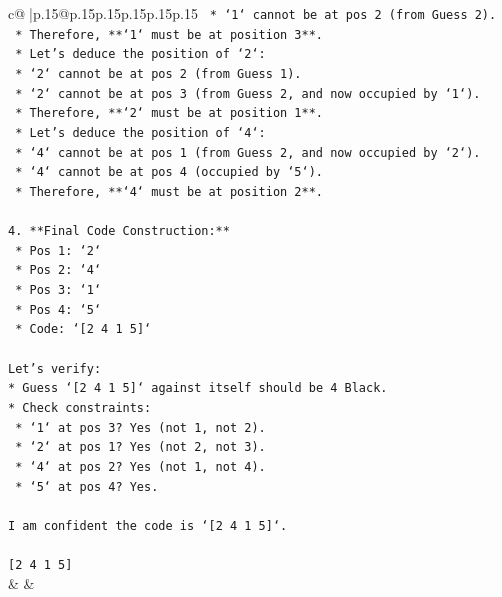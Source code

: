 \documentclass{article}
\begin{document}
{\begin{supertabular}{c@{$\;$}|p{.15\linewidth}@{}p{.15\linewidth}p{.15\linewidth}p{.15\linewidth}p{.15\linewidth}p{.15\linewidth}}
{{{\texttt{        *   `1` cannot be at pos 2 (from Guess 2).} \\
\texttt{        *   Therefore, **`1` must be at position 3**.} \\
\texttt{    *   Let's deduce the position of `2`:} \\
\texttt{        *   `2` cannot be at pos 2 (from Guess 1).} \\
\texttt{        *   `2` cannot be at pos 3 (from Guess 2, and now occupied by `1`).} \\
\texttt{        *   Therefore, **`2` must be at position 1**.} \\
\texttt{    *   Let's deduce the position of `4`:} \\
\texttt{        *   `4` cannot be at pos 1 (from Guess 2, and now occupied by `2`).} \\
\texttt{        *   `4` cannot be at pos 4 (occupied by `5`).} \\
\texttt{        *   Therefore, **`4` must be at position 2**.} \\
\\ 
\texttt{4.  **Final Code Construction:**} \\
\texttt{    *   Pos 1: `2`} \\
\texttt{    *   Pos 2: `4`} \\
\texttt{    *   Pos 3: `1`} \\
\texttt{    *   Pos 4: `5`} \\
\texttt{    *   Code: `{[}2 4 1 5{]}`} \\
\\ 
\texttt{Let's verify:} \\
\texttt{*   Guess `{[}2 4 1 5{]}` against itself should be 4 Black.} \\
\texttt{*   Check constraints:} \\
\texttt{    *   `1` at pos 3? Yes (not 1, not 2).} \\
\texttt{    *   `2` at pos 1? Yes (not 2, not 3).} \\
\texttt{    *   `4` at pos 2? Yes (not 1, not 4).} \\
\texttt{    *   `5` at pos 4? Yes.} \\
\\ 
\texttt{I am confident the code is `{[}2 4 1 5{]}`.} \\
\\ 
\texttt{{[}2 4 1 5{]}} \\
            }
        }
    }
    & & \\ \\


\end{supertabular}}
\end{document}
